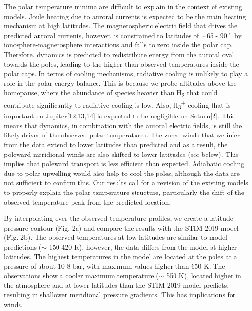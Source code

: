 The polar temperature minima are difficult to explain in the context of existing models. Joule heating due to auroral currents is expected to be the main heating mechanism at high latitudes. The magnetospheric electric field that drives the predicted auroral currents, however, is constrained to latitudes of $\sim$65 - 90˚ by ionosphere-magnetosphere interactions and falls to zero inside the polar cap. Therefore, dynamics is predicted to redistribute energy from the auroral oval towards the poles, leading to the higher than observed temperatures inside the polar caps. In terms of cooling mechanisms, radiative cooling is unlikely to play a role in the polar energy balance. This is because we probe altitudes above the homopause, where the abundance of species heavier than H\textsubscript{2} that could contribute significantly to radiative cooling is low. Also, H\textsubscript{3}\textsuperscript{+} cooling that is important on Jupiter[12,13,14] is expected to be negligible on Saturn[2]. This means that dynamics, in combination with the auroral electric fields, is still the likely driver of the observed polar temperatures. The zonal winds that we infer from the data extend to lower latitudes than predicted and as a result, the poleward meridional winds are also shifted to lower latitudes (see below). This implies that poleward transport is less efficient than expected. Adiabatic cooling due to polar upwelling would also help to cool the poles, although the data are not sufficient to confirm this. Our results call for a revision of the existing models to properly explain the polar temperature structure, particularly the shift of the observed temperature peak from the predicted location.

By interpolating over the observed temperature profiles, we create a latitude-pressure contour (Fig. 2a) and compare the results with the STIM 2019 model (Fig. 2b). The observed temperatures at low latitudes are similar to model predictions ($\sim$ 150-420 K), however, the data differs from the model at higher latitudes. The highest temperatures in the model are located at the poles at a pressure of about 10-8 bar, with maximum values higher than 650 K. The observations show a cooler maximum temperature ($\sim$ 550 K), located higher in the atmosphere and at lower latitudes than the STIM 2019 model predicts, resulting in shallower meridional pressure gradients. This has implications for winds.

